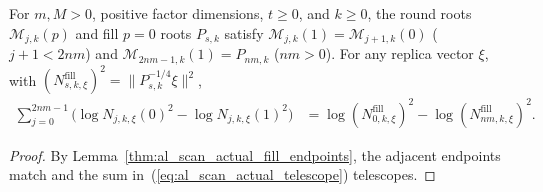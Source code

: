 \begin{lemma}
    \label{thm:al_scan_actual_round_telescope}
    \leanok
    For $m,M>0$, positive factor dimensions, $t\ge0$, and $k\ge0$, the round
    roots $\mathcal M_{j,k}(p)$ and fill $p=0$ roots $P_{s,k}$ satisfy
    $\mathcal M_{j,k}(1)=\mathcal M_{j+1,k}(0)$ ($j+1<2nm$) and
    $\mathcal M_{2nm-1,k}(1)=P_{nm,k}$ ($nm>0$). For any replica vector $\xi$,
    with $(N^{\mathrm{fill}}_{s,k,\xi})^2=\|P_{s,k}^{-1/4}\xi\|^2$,
    \begin{align}
        \sum_{j=0}^{2nm-1}
        \bigl(\log N_{j,k,\xi}(0)^2-\log N_{j,k,\xi}(1)^2\bigr)
         & =\log (N^{\mathrm{fill}}_{0,k,\xi})^2
        -\log (N^{\mathrm{fill}}_{nm,k,\xi})^2.
        \label{eq:al_scan_actual_telescope}
    \end{align}
\end{lemma}
\begin{proof}\leanok
    By Lemma~\ref{thm:al_scan_actual_fill_endpoints}, the adjacent endpoints
    match and the sum in~(\ref{eq:al_scan_actual_telescope}) telescopes.
\end{proof}

